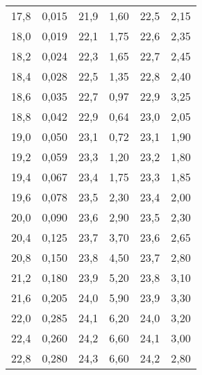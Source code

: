 \begin{longtable}{S[table-format=3.2] S[table-format=3.2] S[table-format=3.2] S[table-format=3.2] S[table-format=3.2] S[table-format=3.2]}
          17,8   &   0,015  &     21,9    &  1,60   & 22,5   &   2,15                                      \\
          18,0   &   0,019  &     22,1    &  1,75   & 22,6   &   2,35                                      \\
          18,2   &   0,024  &     22,3    &  1,65   & 22,7   &   2,45                                      \\
          18,4   &   0,028  &     22,5    &  1,35   & 22,8   &   2,40                                      \\
          18,6   &   0,035  &     22,7    &  0,97   & 22,9   &   3,25                                      \\
          18,8   &   0,042  &     22,9    &  0,64   & 23,0   &   2,05                                      \\
          19,0   &   0,050  &     23,1    &  0,72   & 23,1   &   1,90                                      \\
          19,2   &   0,059  &     23,3    &  1,20   & 23,2   &   1,80                                      \\
          19,4   &   0,067  &     23,4    &  1,75   & 23,3   &   1,85                                      \\
          19,6   &   0,078  &     23,5    &  2,30   & 23,4   &   2,00                                      \\
          20,0   &   0,090  &     23,6    &  2,90   & 23,5   &   2,30                                      \\
          20,4   &   0,125  &     23,7    &  3,70   & 23,6   &   2,65                                      \\
          20,8   &   0,150  &     23,8    &  4,50   & 23,7   &   2,80                                      \\
          21,2   &   0,180  &     23,9    &  5,20   & 23,8   &   3,10                                      \\
          21,6   &   0,205  &     24,0    &  5,90   & 23,9   &   3,30                                      \\
          22,0   &   0,285  &     24,1    &  6,20   & 24,0   &   3,20                                      \\
          22,4   &   0,260  &     24,2    &  6,60   & 24,1   &   3,00                                      \\
          22,8   &   0,280  &     24,3    &  6,60   & 24,2   &   2,80                                      \\

\end{longtable}

